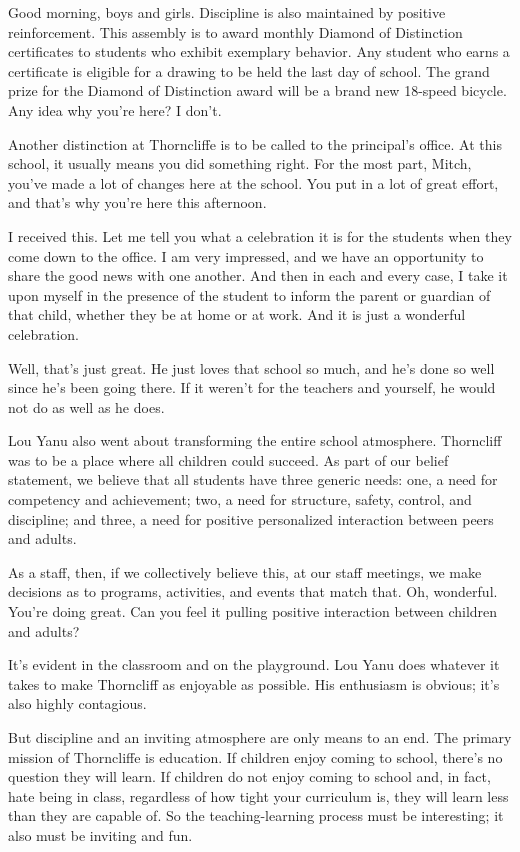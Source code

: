 Good morning, boys and girls. Discipline is also maintained by positive reinforcement. This assembly is to award monthly Diamond of Distinction certificates to students who exhibit exemplary behavior. Any student who earns a certificate is eligible for a drawing to be held the last day of school. The grand prize for the Diamond of Distinction award will be a brand new 18-speed bicycle. Any idea why you're here? I don't.

Another distinction at Thorncliffe is to be called to the principal's office. At this school, it usually means you did something right. For the most part, Mitch, you've made a lot of changes here at the school. You put in a lot of great effort, and that's why you're here this afternoon.

I received this. Let me tell you what a celebration it is for the students when they come down to the office. I am very impressed, and we have an opportunity to share the good news with one another. And then in each and every case, I take it upon myself in the presence of the student to inform the parent or guardian of that child, whether they be at home or at work. And it is just a wonderful celebration.

Well, that's just great. He just loves that school so much, and he's done so well since he's been going there. If it weren't for the teachers and yourself, he would not do as well as he does.

Lou Yanu also went about transforming the entire school atmosphere. Thorncliff was to be a place where all children could succeed. As part of our belief statement, we believe that all students have three generic needs: one, a need for competency and achievement; two, a need for structure, safety, control, and discipline; and three, a need for positive personalized interaction between peers and adults.

As a staff, then, if we collectively believe this, at our staff meetings, we make decisions as to programs, activities, and events that match that. Oh, wonderful. You're doing great. Can you feel it pulling positive interaction between children and adults?

It's evident in the classroom and on the playground. Lou Yanu does whatever it takes to make Thorncliff as enjoyable as possible. His enthusiasm is obvious; it's also highly contagious.

But discipline and an inviting atmosphere are only means to an end. The primary mission of Thorncliffe is education. If children enjoy coming to school, there's no question they will learn. If children do not enjoy coming to school and, in fact, hate being in class, regardless of how tight your curriculum is, they will learn less than they are capable of. So the teaching-learning process must be interesting; it also must be inviting and fun.

